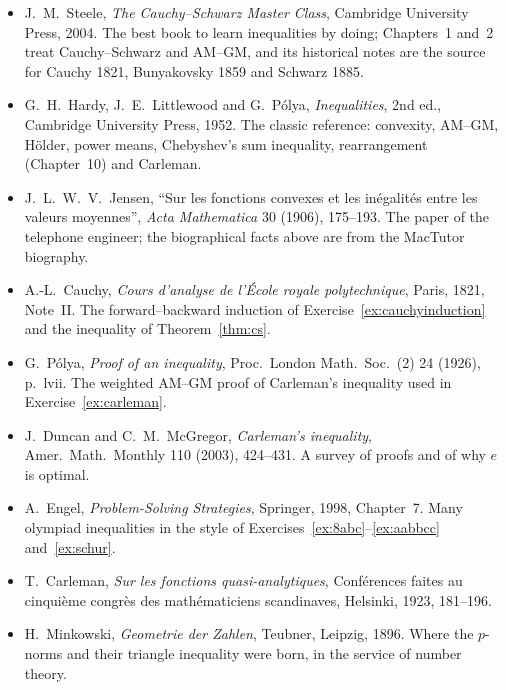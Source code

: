 \begin{itemize}\raggedright
\item J.~M.~Steele, \emph{The Cauchy--Schwarz Master Class}, Cambridge University Press, 2004. The best book to learn inequalities by doing; Chapters~1 and~2 treat Cauchy--Schwarz and AM--GM, and its historical notes are the source for Cauchy 1821, Bunyakovsky 1859 and Schwarz 1885.
\item G.~H.~Hardy, J.~E.~Littlewood and G.~P\'olya, \emph{Inequalities}, 2nd ed., Cambridge University Press, 1952. The classic reference: convexity, AM--GM, H\"older, power means, Chebyshev's sum inequality, rearrangement (Chapter~10) and Carleman.
\item J.~L.~W.~V.~Jensen, ``Sur les fonctions convexes et les in\'egalit\'es entre les valeurs moyennes'', \emph{Acta Mathematica} 30 (1906), 175--193. The paper of the telephone engineer; the biographical facts above are from the MacTutor biography.
\item A.-L.~Cauchy, \emph{Cours d'analyse de l'\'Ecole royale polytechnique}, Paris, 1821, Note~II. The forward--backward induction of Exercise~\ref{ex:cauchyinduction} and the inequality of Theorem~\ref{thm:cs}.
\item G.~P\'olya, \emph{Proof of an inequality}, Proc.\ London Math.\ Soc.\ (2) 24 (1926), p.~lvii. The weighted AM--GM proof of Carleman's inequality used in Exercise~\ref{ex:carleman}.
\item J.~Duncan and C.~M.~McGregor, \emph{Carleman's inequality}, Amer.\ Math.\ Monthly 110 (2003), 424--431. A survey of proofs and of why $e$ is optimal.
\item A.~Engel, \emph{Problem-Solving Strategies}, Springer, 1998, Chapter~7. Many olympiad inequalities in the style of Exercises~\ref{ex:8abc}--\ref{ex:aabbcc} and~\ref{ex:schur}.
\item T.~Carleman, \emph{Sur les fonctions quasi-analytiques}, Conf\'erences faites au cinqui\`eme congr\`es des math\'ematiciens scandinaves, Helsinki, 1923, 181--196.
\item H.~Minkowski, \emph{Geometrie der Zahlen}, Teubner, Leipzig, 1896. Where the $p$-norms and their triangle inequality were born, in the service of number theory.
\end{itemize}
